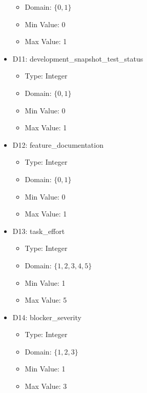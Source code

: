 \documentclass{article}
\begin{document}
\begin{itemize}
\begin{itemize}
            \item Domain: $\{0, 1\}$
            \item Min Value: 0
            \item Max Value: 1
        \end{itemize}
    \item D11: development\_snapshot\_test\_status
        \begin{itemize}
            \item Type: Integer
            \item Domain: $\{0, 1\}$
            \item Min Value: 0
            \item Max Value: 1
        \end{itemize}
    \item D12: feature\_documentation
        \begin{itemize}
            \item Type: Integer
            \item Domain: $\{0, 1\}$
            \item Min Value: 0
            \item Max Value: 1
        \end{itemize}
    \item D13: task\_effort
        \begin{itemize}
            \item Type: Integer
            \item Domain: $\{1, 2, 3, 4, 5\}$
            \item Min Value: 1
            \item Max Value: 5
        \end{itemize}
    \item D14: blocker\_severity
        \begin{itemize}
            \item Type: Integer
            \item Domain: $\{1, 2, 3\}$
            \item Min Value: 1
            \item Max Value: 3
        \end{itemize}
\end{itemize}
\end{document}
